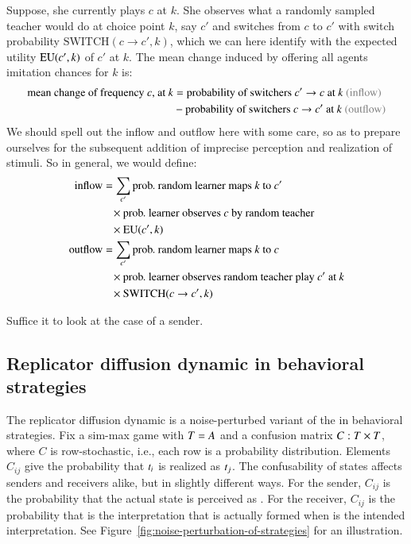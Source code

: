 \documentclass[fleqn,reqno,10pt]{article}
\newcommand{\rd}{\acro{rd}} %
\begin{document}
 Suppose, she currently plays $c$ at $k$. She
observes what a randomly sampled teacher would do at choice point $k$, say $c'$ and switches
from $c$ to $c'$ with switch probability $\text{SWITCH}(c \rightarrow c' , k)$, which we can
here identify with the expected utility $\mathrm{EU}(c',k)$ of $c'$ at $k$. The mean change induced by
offering all agents imitation chances for $k$ is:
\begin{align*}
  \text{mean change of frequency $c$, at $k$} & = \text{probability of switchers $c'
    \rightarrow c$ at $k$ \mygray{(inflow)}} \\
& - \text{probability of switchers $c \rightarrow c'$ at $k$ \mygray{(outflow)}}
\end{align*}
We should spell out the inflow and outflow here with some care, so as to prepare ourselves for
the subsequent addition of imprecise perception and realization of stimuli. So in general, we
would define:
\begin{align*}
  \text{inflow} & = \sum_{c'} \text{prob.~random learner maps $k$ to $c'$} \\
  & \ \ \ \times \text{prob.~learner observes $c$ by random teacher} \\
  & \ \ \ \times \mathrm{EU}(c', k) \\
  \text{outflow} & = \sum_{c'} \text{prob.~random learner maps $k$ to $c$} \\
  & \ \ \ \times \text{prob.~learner observes random teacher play $c'$ at $k$} \\
  & \ \ \ \times \text{SWITCH}(c \rightarrow c' , k)
\end{align*}

Suffice it to look at the case of a sender. 

\subsection{Replicator diffusion dynamic in behavioral strategies}
\label{sec:repl-diff-dynam-1}

The replicator diffusion dynamic is a noise-perturbed variant of the
\rd in behavioral strategies. Fix a sim-max game with $T =
A$ and a confusion matrix $C : T \times T$, where $C$ is
row-stochastic, i.e., each row is a probability
distribution. Elements $C_{ij}$ give the probability that $t_i$
is realized as $t_j$. The confusability of states affects senders
and receivers alike, but in slightly different ways. For the sender,
$C_{ij}$ is the probability that the actual state  is
perceived as . For the receiver, $C_{ij}$ is the
probability that  is the interpretation that is actually
formed when  is the intended interpretation.
See Figure~\ref{fig:noise-perturbation-of-strategies} for an illustration.
\end{document}
